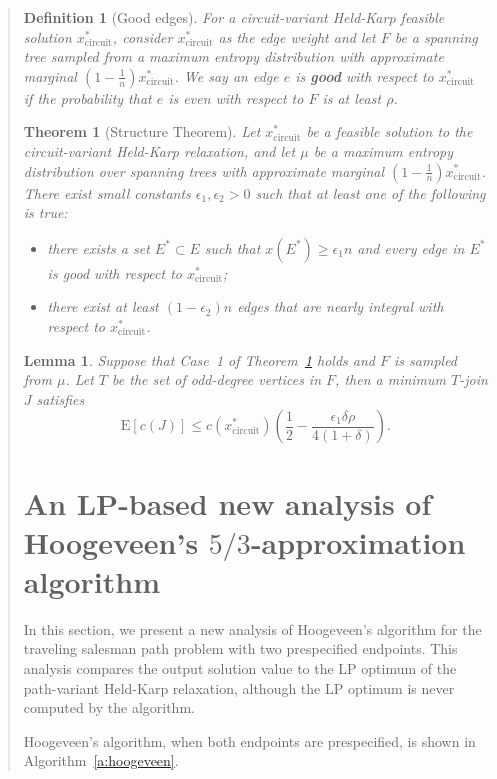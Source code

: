 \documentclass[11pt,letterpaper]{article}
\newtheorem{lemma}{Lemma}
\newtheorem{thm}{Theorem}
\newtheorem{defn}{Definition}
\newcommand{\E}{\mathrm{E}}
\begin{document}
\begin{quote}
\begin{defn}[Good edges]
For a circuit-variant Held-Karp feasible solution $x^*_{\mathrm{circuit}}$, consider $x^*_{\mathrm{circuit}}$ as the edge weight and let $F$ be a spanning tree sampled from a maximum entropy distribution with approximate marginal $(1-\frac{1}{n}) x^*_{\mathrm{circuit}}$. We say an edge $e$ is \textbf{good} with respect to $x^*_{\mathrm{circuit}}$ if the probability that $e$ is even with respect to $F$ is at least $\rho$.
\end{defn}

\begin{thm}[Structure Theorem]
\label{t:structure}
Let $x^*_{\mathrm{circuit}}$ be a feasible solution to the circuit-variant Held-Karp relaxation, and let $\mu$ be a maximum entropy distribution over spanning trees with approximate marginal $(1-\frac{1}{n}) x^*_{\mathrm{circuit}}$. There exist small constants $\epsilon_1 , \epsilon_2 >0$ such that at least one of the following is true:\begin{itemize}
\item[1.] there exists a set $E^*\subset E$ such that $x(E^*)\geq \epsilon_1 n$ and every edge in $E^*$ is good with respect to $x^*_{\mathrm{circuit}}$;
\item[2.] there exist at least $(1-\epsilon_2)n$ edges that are nearly integral with respect to $x^*_{\mathrm{circuit}}$.
\end{itemize}
\end{thm}

\begin{lemma}
\label{l:case1}
Suppose that Case~1 of Theorem~\ref{t:structure} holds and $F$ is sampled from $\mu$. Let $T$ be the set of odd-degree vertices in $F$, then a minimum $T$-join $J$ satisfies\[
\E[c(J)]\leq c(x^*_{\mathrm{circuit}}) (\frac{1}{2}-\frac{\epsilon_1\delta\rho}{4(1+\delta)})
.\]
\end{lemma}

\section{An LP-based new analysis of Hoogeveen's $5/3$-approximation algorithm}\label{s:5over3}

In this section, we present a new analysis of Hoogeveen's algorithm for the traveling salesman path problem with two prespecified endpoints. This analysis compares the output solution value to the LP optimum of the path-variant Held-Karp relaxation, although the LP optimum is never computed by the algorithm.

Hoogeveen's algorithm, when both endpoints are prespecified, is shown in Algorithm~\ref{a:hoogeveen}.


\end{quote}
\end{document}
